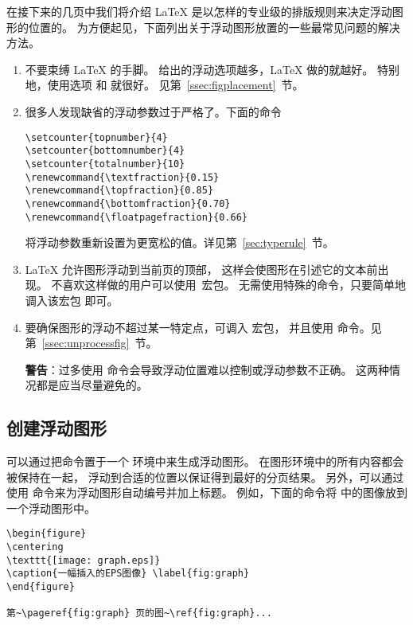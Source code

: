 在接下来的几页中我们将介绍 \LaTeX{} 是以怎样的专业级的排版规则来决定浮动图形的位置的。
为方便起见，下面列出关于浮动图形放置的一些最常见问题的解决方法。
\begin{enumerate}
	\item 不要束缚 \LaTeX{} 的手脚。
	给出的浮动选项越多，\LaTeX{} 做的就越好。
	特别地，使用选项 \opt{[htbp]} 和 \opt{[tbp]}	就很好。
	见第~\ref{ssec:figplacement}~节。
	
	\item 很多人发现缺省的浮动参数过于严格了。下面的命令
\begin{lstlisting}
\setcounter{topnumber}{4}
\setcounter{bottomnumber}{4}
\setcounter{totalnumber}{10}
\renewcommand{\textfraction}{0.15}
\renewcommand{\topfraction}{0.85}
\renewcommand{\bottomfraction}{0.70}
\renewcommand{\floatpagefraction}{0.66}
\end{lstlisting}
	将浮动参数重新设置为更宽松的值。详见第~\ref{sec:typerule}~节。
	
	\item \LaTeX{} 允许图形浮动到当前页的顶部，
	这样会使图形在引述它的文本前出现。
	不喜欢这样做的用户可以使用~宏包。
	无需使用特殊的命令，只要简单地调入该宏包  即可。
	
	\item 要确保图形的浮动不超过某一特定点，可调入  宏包，
	并且使用  命令。见第~\ref{ssec:unprocessfig}~节。
	
	\textbf{警告}：过多使用 	命令会导致浮动位置难以控制或浮动参数不正确。
	这两种情况都是应当尽量避免的。
\end{enumerate}

\subsection{创建浮动图形}\label{ssec:creatfloatfig}
可以通过把命令置于一个  环境中来生成浮动图形。
在图形环境中的所有内容都会被保持在一起，
浮动到合适的位置以保证得到最好的分页结果。
另外，可以通过使用  命令来为浮动图形自动编号并加上标题。
例如，下面的命令将  中的图像放到一个浮动图形中。
\begin{lstlisting}
\begin{figure} 
\centering 
\texttt{[image: graph.eps]} 
\caption{一幅插入的EPS图像} \label{fig:graph} 
\end{figure}

第~\pageref{fig:graph} 页的图~\ref{fig:graph}...
\end{lstlisting}

